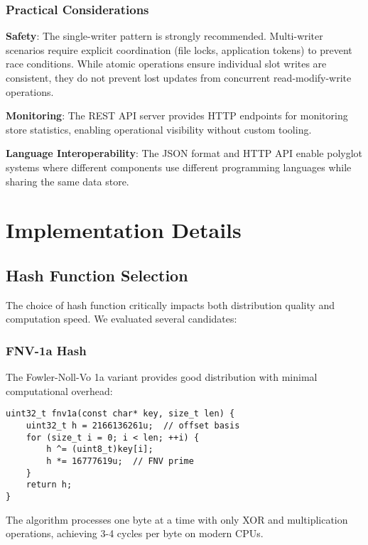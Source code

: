 \documentclass[10pt,conference]{IEEEtran}
\begin{document}
\subsubsection{Practical Considerations}

\textbf{Safety}: The single-writer pattern is strongly recommended. Multi-writer scenarios require explicit coordination (file locks, application tokens) to prevent race conditions. While atomic operations ensure individual slot writes are consistent, they do not prevent lost updates from concurrent read-modify-write operations.

\textbf{Monitoring}: The REST API server provides HTTP endpoints for monitoring store statistics, enabling operational visibility without custom tooling.

\textbf{Language Interoperability}: The JSON format and HTTP API enable polyglot systems where different components use different programming languages while sharing the same data store.

\section{Implementation Details}
\label{sec:implementation}

\subsection{Hash Function Selection}

The choice of hash function critically impacts both distribution quality and computation speed. We evaluated several candidates:

\subsubsection{FNV-1a Hash}
The Fowler-Noll-Vo 1a variant provides good distribution with minimal computational overhead:

\begin{lstlisting}[caption={FNV-1a implementation},label={lst:fnv1a}]
uint32_t fnv1a(const char* key, size_t len) {
    uint32_t h = 2166136261u;  // offset basis
    for (size_t i = 0; i < len; ++i) {
        h ^= (uint8_t)key[i];
        h *= 16777619u;  // FNV prime
    }
    return h;
}
\end{lstlisting}

The algorithm processes one byte at a time with only XOR and multiplication operations, achieving 3-4 cycles per byte on modern CPUs.
\end{document}
